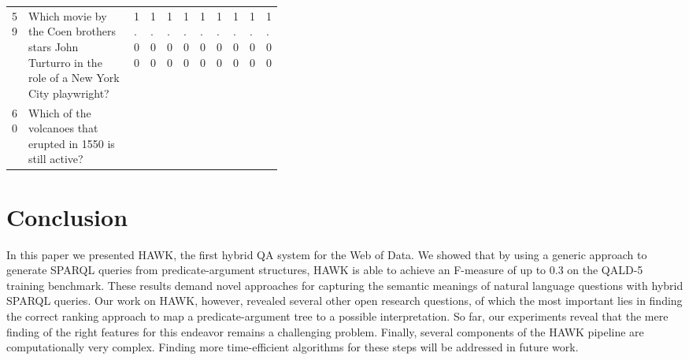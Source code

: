 \begin{table}[htb]
{\begin{tabular}{@{}lp{0.4\linewidth}lllllllll@{}}
59       & Which movie by the Coen brothers stars John Turturro in the role of a New York City playwright?             & 1.00                        & 1.00                         & 1.00                         & 1.00                      & 1.00                      & 1.00                      & 1.00                     & 1.00                     & 1.00                     \\
60       & Which of the volcanoes that erupted in 1550 is still active?                                                & \cellcolor[HTML]{BBDAFF}    & \cellcolor[HTML]{BBDAFF}     & \cellcolor[HTML]{BBDAFF}     & \cellcolor[HTML]{BBDAFF}  & \cellcolor[HTML]{BBDAFF}  & \cellcolor[HTML]{BBDAFF}  & \cellcolor[HTML]{BBDAFF} & \cellcolor[HTML]{BBDAFF} & \cellcolor[HTML]{BBDAFF} \\ \bottomrule
\end{tabular}
}
\label{tab:eval_qal5_detail}

\end{table}

\section{Conclusion}
\label{chaclef:sec:conclusion}

In this paper we presented HAWK, the first hybrid QA system for the Web of Data. We showed that by using a generic approach to generate SPARQL queries from predicate-argument structures, HAWK is able to achieve an F-measure of up to 0.3 on the QALD-5 training benchmark. 
These results demand novel approaches for capturing the semantic meanings of natural language questions with hybrid SPARQL queries.
Our work on HAWK, however, revealed several other open research questions, of which the most important lies in finding the correct ranking approach to map a predicate-argument tree to a possible interpretation. 
So far, our experiments reveal that the mere finding of the right features for this endeavor remains a challenging problem. 
Finally, several components of the HAWK pipeline are computationally very complex.
Finding more time-efficient algorithms for these steps will be addressed in future work.



%
%

%